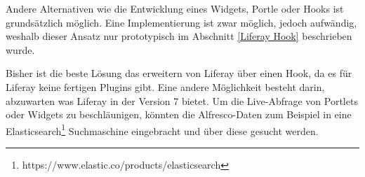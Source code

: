 Andere Alternativen wie die Entwicklung eines Widgets, Portle oder Hooks ist grunds\"atzlich m\"oglich. Eine Implementierung ist zwar m\"oglich, jedoch aufw\"andig, weshalb dieser Ansatz nur prototypisch im Abschnitt \ref{Liferay Hook} beschrieben wurde.

Bisher ist die beste L\"osung das erweitern von Liferay \"uber einen Hook, da es f\"ur Liferay keine fertigen Plugins gibt. Eine andere M\"oglichkeit besteht darin, abzuwarten was Liferay in der Version 7 bietet. Um die Live-Abfrage von Portlets oder Widgets zu beschl\"aunigen, k\"onnten die Alfresco-Daten zum Beispiel in eine Elasticsearch\footnote{https://www.elastic.co/products/elasticsearch} Suchmaschine eingebracht und \"uber diese gesucht werden. \cite{Wiki_Elastic} \cite{elastic}
